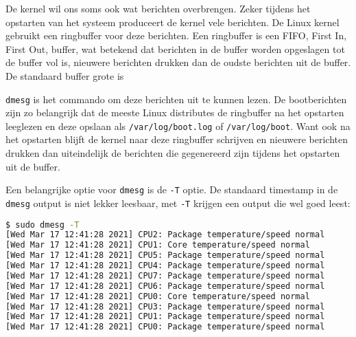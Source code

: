 De kernel wil ons soms ook wat berichten overbrengen. Zeker tijdens het opstarten van het systeem produceert de kernel vele berichten. De Linux kernel gebruikt een ringbuffer voor deze berichten. Een ringbuffer is een FIFO, First In, First Out, buffer, wat betekend dat berichten in de buffer worden opgeslagen tot de buffer vol is, nieuwere berichten drukken dan de oudste berichten uit de buffer. De standaard buffer grote is 

\texttt{dmesg} is het commando om deze berichten uit te kunnen lezen. De bootberichten zijn zo belangrijk dat de meeste Linux distributes de ringbuffer na het opstarten leeglezen en deze opslaan als \texttt{/var/log/boot.log} of \texttt{/var/log/boot}. Want ook na het opstarten blijft de kernel naar deze ringbuffer schrijven en nieuwere berichten drukken dan uiteindelijk de berichten die gegenereerd zijn tijdens het opstarten uit de buffer.

Een belangrijke optie voor \texttt{dmesg} is de \texttt{-T} optie. De standaard timestamp in de \texttt{dmesg} output is niet lekker leesbaar, met \texttt{-T} krijgen een output die wel goed leest:
\begin{lstlisting}[language=bash]
$ sudo dmesg -T
[Wed Mar 17 12:41:28 2021] CPU2: Package temperature/speed normal
[Wed Mar 17 12:41:28 2021] CPU1: Core temperature/speed normal
[Wed Mar 17 12:41:28 2021] CPU5: Package temperature/speed normal
[Wed Mar 17 12:41:28 2021] CPU4: Package temperature/speed normal
[Wed Mar 17 12:41:28 2021] CPU7: Package temperature/speed normal
[Wed Mar 17 12:41:28 2021] CPU6: Package temperature/speed normal
[Wed Mar 17 12:41:28 2021] CPU0: Core temperature/speed normal
[Wed Mar 17 12:41:28 2021] CPU3: Package temperature/speed normal
[Wed Mar 17 12:41:28 2021] CPU1: Package temperature/speed normal
[Wed Mar 17 12:41:28 2021] CPU0: Package temperature/speed normal
\end{lstlisting}
